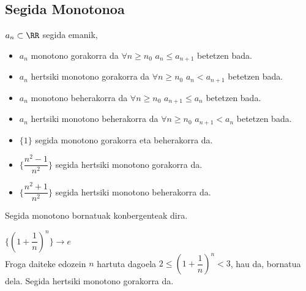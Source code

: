 \subsection{Segida Monotonoa}
\begin{definizio}
\item
${a_{n}} \subset \RR$ segida emanik,
\begin{itemize}
\item
${a_{n}}$ monotono gorakorra da $\forall n \geqslant {n_{0}}$ \hspace{0.3cm} ${a_{n}} \leqslant {a_{n+1}}$ betetzen bada.
\item
${a_{n}}$ hertsiki monotono gorakorra da $\forall n \geqslant {n_{0}}$ \hspace{0.3cm} ${a_{n}}<{a_{n+1}}$ betetzen bada.
\item
${a_{n}}$ monotono beherakorra da $\forall n \geqslant {n_{0}}$ \hspace{0.3cm} ${a_{n+1}} \leqslant {a_{n}}$ betetzen bada.
\item
${a_{n}}$ hertsiki monotono beherakorra da $\forall n \geqslant {n_{0}}$ \hspace{0.3cm} ${a_{n+1}}<{a_{n}}$ betetzen bada.
\end{itemize}
\end{definizio}
\begin{adibide}
\item
\begin{itemize}
\item
$\lbrace 1 \rbrace$ segida monotono gorakorra eta beherakorra da.
\item
$\lbrace \dfrac{n^{2}-1}{n^{2}} \rbrace$ segida hertsiki monotono gorakorra da.
\item
$\lbrace \dfrac{n^{2}+1}{n^{2}} \rbrace$ segida hertsiki monotono beherakorra da.
\end{itemize}
\end{adibide}
\begin{teorema}
\item
Segida monotono bornatuak konbergenteak dira.
\end{teorema}
\begin{adibide}
\item
$\lbrace (1+\dfrac{1}{n})^{n} \rbrace \rightarrow e$\\

Froga daiteke edozein $n$ hartuta dagoela $2\leqslant(1+\dfrac{1}{n})^{n}<3$, hau da, bornatua dela. Segida hertsiki monotono gorakorra da.
\end{adibide}
